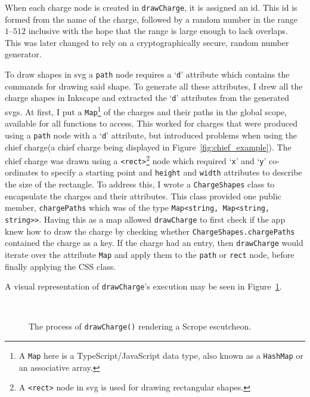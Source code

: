 \documentclass[nobib, a4paper, twoside, justified]{tufte-book}
\makeatletter
\newcommand{\svg}{\gls{svg}\@\xspace}
\newcommand{\svgs}{\glspl{svg}\@\xspace}
\newcommand{\charge}{\gls{charge}\@\xspace}
\newcommand{\charges}{\glspl{charge}\@\xspace}
\makeatother
\begin{document}
When each \charge node is created in \texttt{drawCharge}, it is assigned an id. This id is formed
from the name of the charge, followed by a random number in the range $1\text{--}512$ inclusive
with the hope that the range is large enough to lack overlaps. This was later changed to rely on a
cryptographically secure, random number generator.

To draw shapes in \svg a \texttt{path} node requires a `\texttt{d}' attribute which contains the
commands for drawing said shape. To generate all these attributes, I drew all the \charge shapes in
Inkscape and extracted the `\texttt{d}' attributes from the generated \svgs. At first, I put a
\texttt{Map}\footnote{A \texttt{Map} here is a TypeScript/JavaScript data type, also known as a
\texttt{HashMap} or an associative array.} of the \charges and their paths in the global scope,
available for all functions to access. This worked for \charges that were produced using a
\texttt{path} node with a `\texttt{d}' attribute, but introduced problems when using the
chief \charge (a chief \charge being displayed in Figure~\ref{fig:chief_example}). The
chief \charge was drawn using a \texttt{<rect>}\footnote{A \texttt{<rect>} node in \svg is used for
drawing rectangular shapes.} node which required `\texttt{x}' and `\texttt{y}'
co-ordinates to specify a starting point and \texttt{height} and \texttt{width} attributes to
describe the size of the rectangle. To address this, I wrote a \texttt{ChargeShapes} class to
encapsulate the \charges and their attributes. This class provided one public member,
\texttt{chargePaths} which was of the type \texttt{Map<string, Map<string, string>\hphantom>}.
Having this as a map allowed \texttt{drawCharge} to first check if the app knew how to draw the
\charge by checking whether \texttt{ChargeShapes.chargePaths} contained the \charge as a key.  If
the \charge had an entry, then \texttt{drawCharge} would iterate over the attribute \texttt{Map}
and apply them to the \texttt{path} or \texttt{rect} node, before finally applying the CSS class.

A visual representation of \texttt{drawCharge}'s execution may be seen in
Figure~\ref{fig:draw_charge}.

\begin{figure}
  \centering
  \qquad
  \\
  \qquad
  \caption{The process of \texttt{drawCharge()} rendering a Scrope \gls{escutcheon}.}%
  \label{fig:draw_charge}
\end{figure}
\end{document}
